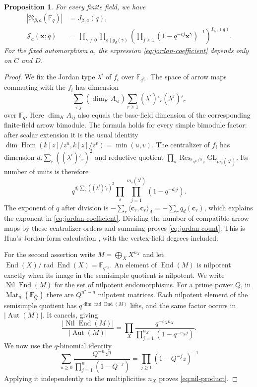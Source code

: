 \documentclass[11pt, reqno]{amsart}
\numberwithin{equation}{section}
\newtheorem{proposition}[theorem]{Proposition}
\theoremstyle{definition}
\theoremstyle{remark}
\newcommand{\op}[1]{\operatorname{#1}}
\newcommand{\mr}[1]{\mathrm{#1}}
\newcommand{\mb}[1]{\mathbb{#1}}
\newcommand{\mc}[1]{\mathcal{#1}}
\newcommand{\End}{\op{End}}
\newcommand{\Hom}{\op{Hom}}
\newcommand{\rad}{\op{rad}}
\newcommand{\Aut}{\op{Aut}}
\newcommand{\Res}{\op{Res}}
\begin{document}
\begin{proposition}\label{prop:nil-jordan}
For every finite field, we have
\begin{align}
 |\mathfrak N_{\beta,a}(\mb F_q)|&=J_{\beta,a}(q),\label{eq:jordan-count}\\
 \mc J_a(\mathbf x;q)
 &=\prod_{\gamma\ne0}\prod_{e\mid g_d(\gamma)}
       \left(\prod_{j\geq1}(1-q^{-ej}\mathbf x^\gamma)^{-1}\right)^{I_{\gamma,e}(q)}.
       \label{eq:nil-product}
\end{align}
For the fixed automorphism $a$, the expression
\eqref{eq:jordan-coefficient} depends only on $C$ and $D$.
\end{proposition}
\begin{proof}
We fix the Jordan type $\lambda^i$ of $f_i$ over $\mb F_{q^{d_i}}$.
The space of arrow maps commuting with the $f_i$ has dimension
\[ \sum_{i,j}(\dim_K A_{ij})\sum_{r\geq1}(\lambda^i)'_r(\lambda^j)'_r \]
over $\mb F_q$. Here $\dim_K A_{ij}$ also equals the base-field
dimension of the corresponding finite-field arrow bimodule. The formula
holds for every simple bimodule factor: after scalar extension it is
the usual identity $\dim\Hom(k[z]/z^u,k[z]/z^v)=\min(u,v)$.
The centralizer of $f_i$ has dimension
$d_i\sum_r((\lambda^i)'_r)^2$ and reductive quotient
$\prod_s\Res_{\mb F_{q^{d_i}}/\mb F_q}
\mr{GL}_{m_s(\lambda^i)}$. Its number of units is therefore
\[ q^{d_i\sum_r((\lambda^i)'_r)^2} \prod_s\prod_{j=1}^{m_s(\lambda^i)}(1-q^{-d_i j}). \]
The exponent of $q$ after division is
$-\sum_r\langle\mathbf c_r,\mathbf c_r\rangle_A
=-\sum_r q_d(\mathbf c_r)$, which explains the exponent in
\eqref{eq:jordan-coefficient}.
Dividing the number of compatible arrow maps by these centralizer
orders and summing proves \eqref{eq:jordan-count}. This is Hua's Jordan-form calculation \cite{Hua}, with the
vertex-field degrees included.

For the second assertion write $M=\bigoplus_X X^{n_X}$ and let
$\End(X)/\rad\End(X)=\mb F_{q^{e_X}}$. An element of $\End(M)$ is
nilpotent exactly when its image in the semisimple quotient is
nilpotent. We write $\op{Nil}\End(M)$ for the set of
nilpotent endomorphisms. For a prime power $Q$, in
$\op{Mat}_n(\mb F_Q)$ there are
$Q^{n^2-n}$ nilpotent matrices. Each nilpotent element of the semisimple quotient has
$q^{\dim\rad\End(M)}$ lifts, and the same factor occurs in
$|\Aut(M)|$. It cancels, giving
\[ \frac{|\op{Nil}\End(M)|}{|\Aut(M)|} =\prod_X\frac{q^{-e_X n_X}} {\prod_{j=1}^{n_X}(1-q^{-e_Xj})}. \]
We now use the $q$-binomial identity
\[ \sum_{n\geq0}\frac{Q^{-n}z^n}{\prod_{j=1}^n(1-Q^{-j})} =\prod_{j\geq1}(1-Q^{-j}z)^{-1} \]
Applying it independently to the multiplicities $n_X$ proves
\eqref{eq:nil-product}.
\end{proof}
\end{document}
